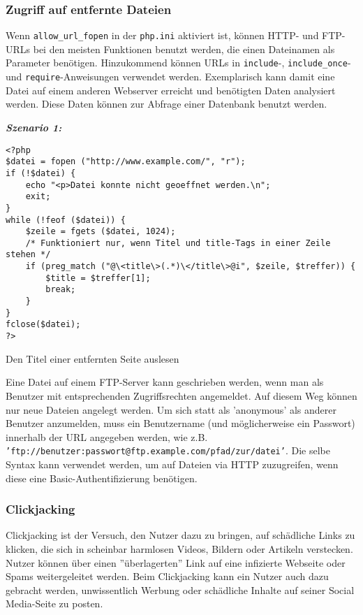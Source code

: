 \subsubsection{Zugriff auf entfernte Dateien}

Wenn \texttt{allow\_url\_fopen} in der \texttt{php.ini} aktiviert ist, können HTTP- und FTP-URLs bei den meisten Funktionen benutzt werden, die einen Dateinamen als Parameter benötigen. Hinzukommend können URLs in \texttt{include}-, \texttt{include\_once}- und \texttt{require}-Anweisungen verwendet werden. Exemplarisch kann damit eine Datei auf einem anderen Webserver erreicht und benötigten Daten analysiert werden. Diese Daten können zur Abfrage einer Datenbank benutzt werden\cite{zaed08}.

\textbf{\textit{Szenario 1:}}\\

\begin{Listing}[h]
	\begin{lstlisting}
<?php
$datei = fopen ("http://www.example.com/", "r");
if (!$datei) {
	echo "<p>Datei konnte nicht geoeffnet werden.\n";
	exit;
}
while (!feof ($datei)) {
	$zeile = fgets ($datei, 1024);
	/* Funktioniert nur, wenn Titel und title-Tags in einer Zeile stehen */
	if (preg_match ("@\<title\>(.*)\</title\>@i", $zeile, $treffer)) {
		$title = $treffer[1];
		break;
	}
}
fclose($datei);
?>
	\end{lstlisting}
	\caption{Den Titel einer entfernten Seite auslesen}
	\label{lst:zaed1}
\end{Listing}

Eine Datei auf einem FTP-Server kann geschrieben werden, wenn man als Benutzer mit entsprechenden Zugriffsrechten angemeldet. Auf diesem Weg können nur neue Dateien angelegt werden. Um sich statt als 'anonymous' als anderer Benutzer anzumelden, muss ein Benutzername (und möglicherweise ein Passwort) innerhalb der URL angegeben werden, wie z.B. \texttt{'ftp://benutzer:passwort@ftp.example.com/pfad/zur/datei'}. Die selbe Syntax kann verwendet werden, um auf Dateien via HTTP zuzugreifen, wenn diese eine Basic-Authentifizierung benötigen\cite{zaed08}.

\subsubsection{Clickjacking}

Clickjacking ist der Versuch, den Nutzer dazu zu bringen, auf schädliche Links zu klicken, die sich in scheinbar harmlosen Videos, Bildern oder Artikeln verstecken. Nutzer können über einen ''überlagerten'' Link auf eine infizierte Webseite oder Spams weitergeleitet werden. Beim Clickjacking kann ein Nutzer auch dazu gebracht werden, unwissentlich Werbung oder schädliche Inhalte auf seiner Social Media-Seite zu posten\cite{cj16}.\\
\\
\\
\\

